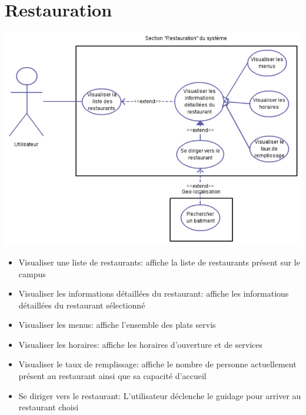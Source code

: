 \section{Restauration}
\includegraphics[scale=1,angle=90]{cu/Restauration.pdf}
\newpage
\begin{itemize}
\item Visualiser une liste de restaurants: affiche la liste de restaurants présent sur le campus
\item Visualiser les informations détaillées du restaurant: affiche les informations détaillées du restaurant sélectionné
\item Visualiser les menus: affiche l’ensemble des plats servis
\item Visualiser les horaires: affiche les horaires d’ouverture et de services
\item Visualiser le taux de remplissage: affiche le nombre de personne actuellement présent au restaurant ainsi que sa capacité d’accueil
\item Se diriger vers le restaurant: L’utilisateur déclenche le guidage pour arriver au restaurant choisi
\end{itemize}
\newpage


